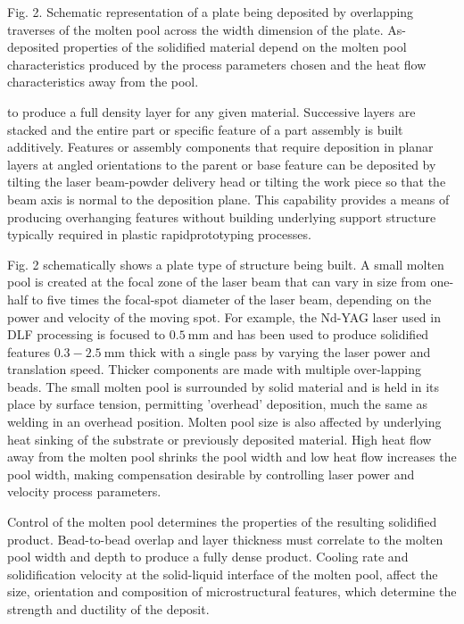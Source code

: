 \documentclass[10pt]{article}
\begin{document}
Fig. 2. Schematic representation of a plate being deposited by overlapping traverses of the molten pool across the width dimension of the plate. As-deposited properties of the solidified material depend on the molten pool characteristics produced by the process parameters chosen and the heat flow characteristics away from the pool.

to produce a full density layer for any given material. Successive layers are stacked and the entire part or specific feature of a part assembly is built additively. Features or assembly components that require deposition in planar layers at angled orientations to the parent or base feature can be deposited by tilting the laser beam-powder delivery head or tilting the work piece so that the beam axis is normal to the deposition plane. This capability provides a means of producing overhanging features without building underlying support structure typically required in plastic rapidprototyping processes.

Fig. 2 schematically shows a plate type of structure being built. A small molten pool is created at the focal zone of the laser beam that can vary in size from one-half to five times the focal-spot diameter of the laser beam, depending on the power and velocity of the moving spot. For example, the Nd-YAG laser used in DLF processing is focused to $0.5 \mathrm{~mm}$ and has been used to produce solidified features $0.3-2.5 \mathrm{~mm}$ thick with a single pass by varying the laser power and translation speed. Thicker components are made with multiple over-lapping beads. The small molten pool is surrounded by solid material and is held in its place by surface tension, permitting 'overhead' deposition, much the same as welding in an overhead position. Molten pool size is also affected by underlying heat sinking of the substrate or previously deposited material. High heat flow away from the molten pool shrinks the pool width and low heat flow increases the pool width, making compensation desirable by controlling laser power and velocity process parameters.

Control of the molten pool determines the properties of the resulting solidified product. Bead-to-bead overlap and layer thickness must correlate to the molten pool width and depth to produce a fully dense product. Cooling rate and solidification velocity at the solid-liquid interface of the molten pool, affect the size, orientation and composition of microstructural features, which determine the strength and ductility of the deposit.
\end{document}

